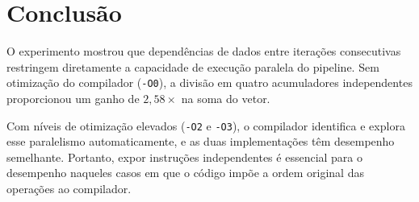 \documentclass[11pt,letterpaper]{article}
\begin{document}
\section{Conclusão}
O experimento mostrou que dependências de dados entre iterações consecutivas
restringem diretamente a capacidade de execução paralela do pipeline. Sem
otimização do compilador (\texttt{-O0}), a divisão em quatro acumuladores
independentes proporcionou um ganho de $2,58\times$ na soma do vetor.

Com níveis de otimização elevados (\texttt{-O2} e \texttt{-O3}), o compilador
identifica e explora esse paralelismo automaticamente, e as duas implementações
têm desempenho semelhante. Portanto, expor instruções independentes é essencial
para o desempenho naqueles casos em que o código impõe a ordem original das
operações ao compilador.
\end{document}
